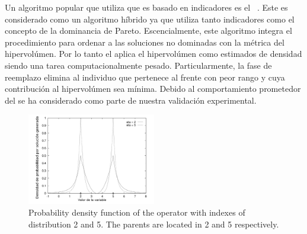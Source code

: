 Un algoritmo popular que utiliza que es basado en indicadores es el \SMSEMOA{}~\cite{Joel:SMSEMOA}.
%
Este \MOEA{} es considerado como un algoritmo híbrido ya que utiliza tanto indicadores como el concepto de la dominancia de Pareto.
%
Escencialmente, este algoritmo integra el procedimiento para ordenar a las soluciones no dominadas con la métrica del hipervolúmen.
%
Por lo tanto el \SMSEMOA{} aplica el hipervolúmen como estimados de densidad siendo una tarea computacionalmente pesado.
%
Particularmente, la fase de reemplazo elimina al individuo que pertenece al frente con peor rango y cuya contribución al hipervolúmen sea mínima.
%
Debido al comportamiento prometedor del \SMSEMOA{} se ha considerado como parte de nuestra validación experimental.
%

\begin{figure}[!t]
\centering
\includegraphics[width=0.5\textwidth]{img/Operadores/DensitySBX.png} 
\caption{Probability density function of the \SBX{} operator with indexes of distribution 2 and 5. The parents are located in 2 and 5 respectively.}
\label{fig:fig_sim}
\end{figure}

